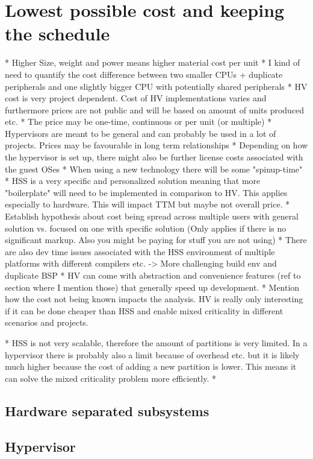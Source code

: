 \section{Lowest possible cost and keeping the schedule}
* Higher Size, weight and power means higher material cost per unit
	* I kind of need to quantify the cost difference between two smaller CPUs 		+ duplicate peripherals and one slightly bigger CPU with potentially 		shared peripherals
* HV cost is very project dependent. Cost of HV implementations varies and furthermore prices are not public and will be based on amount of units produced etc.
    * The price may be one-time, continuous or per unit (or multiple)
* Hypervisors are meant to be general and can probably be used in a lot of projects. Prices may be favourable in long term relationships
* Depending on how the hypervisor is set up, there might also be further license costs associated with the guest OSes 
* When using a new technology there will be some "spinup-time"
* HSS is a very specific and personalized solution meaning that more "boilerplate" will need to be implemented in comparison to HV. This applies especially to hardware. This will impact TTM but maybe not overall price.
    * Establish hypothesis about cost being spread across multiple users with general solution vs. focused on one with specific solution (Only applies if there is no significant markup. Also you might be paying for stuff you are not using)
* There are also dev time issues associated with the HSS environment of multiple platforms with different compilers etc. -> More challenging build env and duplicate BSP
* HV can come with abstraction and convenience features (ref to section where I mention those) that generally speed up development.
* Mention how the cost not being known impacts the analysis. HV is really only interesting if it can be done cheaper than HSS and enable mixed criticality in different scenarios and projects. 

* HSS is not very scalable, therefore the amount of partitions is very limited. In a hypervisor there is probably also a limit because of overhead etc. but it is likely much higher because the cost of adding a new partition is lower. This means it can solve the mixed criticality problem more efficiently.
* 
\subsection{Hardware separated subsystems}
\subsection{Hypervisor}

